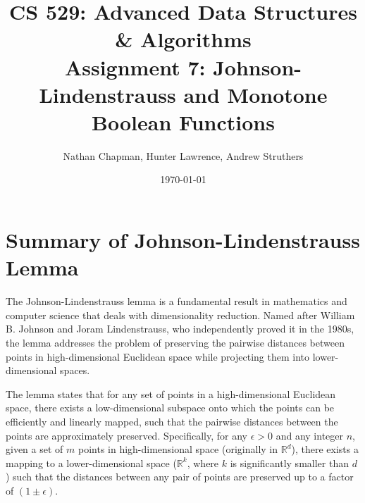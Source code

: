 \documentclass{article}
\title{\vspace*{-0.625in}CS 529: Advanced Data Structures \& Algorithms \\ Assignment 7: Johnson-Lindenstrauss and Monotone Boolean Functions}
\author{Nathan Chapman, Hunter Lawrence, Andrew Struthers}
\date{\today}
\renewcommand{\_}{\ifincsname_\else\legacyunderscore\fi}
\begin{document}
\maketitle

\section*{Summary of Johnson-Lindenstrauss Lemma}

The Johnson-Lindenstrauss lemma is a fundamental result in mathematics and computer science that deals with dimensionality reduction. Named after William B. Johnson and Joram Lindenstrauss, who independently proved it in the 1980s, the lemma addresses the problem of preserving the pairwise distances between points in high-dimensional Euclidean space while projecting them into lower-dimensional spaces.

The lemma states that for any set of points in a high-dimensional Euclidean space, there exists a low-dimensional subspace onto which the points can be efficiently and linearly mapped, such that the pairwise distances between the points are approximately preserved. Specifically, for any $\epsilon > 0$ and any integer $n$, given a set of $m$ points in high-dimensional space (originally in $\mathbb{R}^d$), there exists a mapping to a lower-dimensional space ($\mathbb{R}^k$, where $k$ is significantly smaller than $d$) such that the distances between any pair of points are preserved up to a factor of $(1 \pm \epsilon)$.
\end{document}
